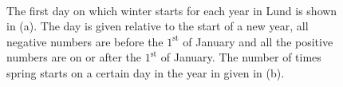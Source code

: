 \begin{figure}[ht!]
\centering
{} 
\\
\caption{The first day on which winter starts for each year in Lund is shown in (a). The day is given relative to the start of a new year, all negative numbers are before the $1^{\text{st}}$ of January and all the positive numbers are on or after the $1^\text{st}$ of January.  The number of times spring starts on a certain day in the year in given in (b).}
\label{fig:winter}
\end{figure}

















